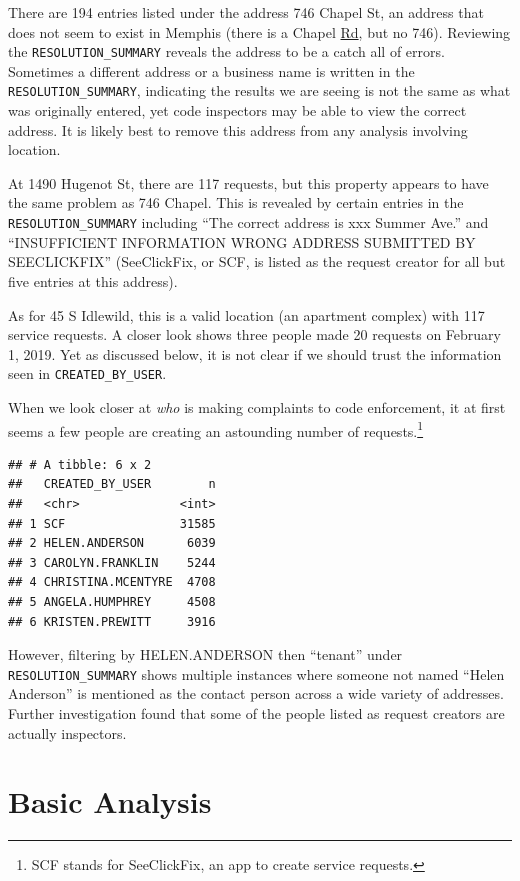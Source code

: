 \documentclass[
]{book}
\begin{document}
There are 194 entries listed under the address 746 Chapel St, an address that does not seem to exist in Memphis (there is a Chapel \underline{Rd}, but no 746). Reviewing the \texttt{RESOLUTION\_SUMMARY} reveals the address to be a catch all of errors. Sometimes a different address or a business name is written in the \texttt{RESOLUTION\_SUMMARY}, indicating the results we are seeing is not the same as what was originally entered, yet code inspectors may be able to view the correct address. It is likely best to remove this address from any analysis involving location.

At 1490 Hugenot St, there are 117 requests, but this property appears to have the same problem as 746 Chapel. This is revealed by certain entries in the \texttt{RESOLUTION\_SUMMARY} including ``The correct address is xxx Summer Ave.'' and ``INSUFFICIENT INFORMATION WRONG ADDRESS SUBMITTED BY SEECLICKFIX'' (SeeClickFix, or SCF, is listed as the request creator for all but five entries at this address).

As for 45 S Idlewild, this is a valid location (an apartment complex) with 117 service requests. A closer look shows three people made 20 requests on February 1, 2019. Yet as discussed below, it is not clear if we should trust the information seen in \texttt{CREATED\_BY\_USER}.

When we look closer at \emph{who} is making complaints to code enforcement, it at first seems a few people are creating an astounding number of requests.\footnote{SCF stands for SeeClickFix, an app to create service requests.}

\begin{verbatim}
## # A tibble: 6 x 2
##   CREATED_BY_USER        n
##   <chr>              <int>
## 1 SCF                31585
## 2 HELEN.ANDERSON      6039
## 3 CAROLYN.FRANKLIN    5244
## 4 CHRISTINA.MCENTYRE  4708
## 5 ANGELA.HUMPHREY     4508
## 6 KRISTEN.PREWITT     3916
\end{verbatim}

However, filtering by HELEN.ANDERSON then ``tenant'' under \texttt{RESOLUTION\_SUMMARY} shows multiple instances where someone not named ``Helen Anderson'' is mentioned as the contact person across a wide variety of addresses. Further investigation found that some of the people listed as request creators are actually inspectors.

\hypertarget{basic-analysis}{%
\section{Basic Analysis}\label{basic-analysis}}
\end{document}
